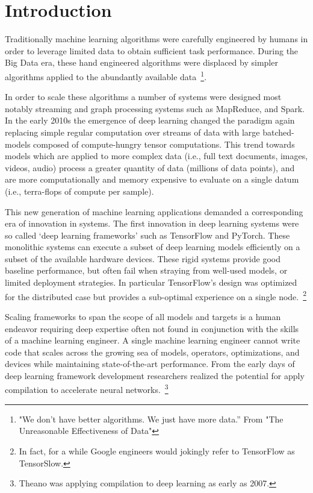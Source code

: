\chapter{Introduction}
\label{ch:intro}

Traditionally machine learning algorithms were carefully engineered by humans
  in order to leverage limited data to obtain sufficient task performance.
During the Big Data era, these hand engineered algorithms were displaced by
  simpler algorithms applied to the abundantly available data~\citep{unreasonable}\footnote{"We don’t have better algorithms. We just have more data.” From "The Unreasonable Effectiveness of Data"}.

In order to scale these algorithms a number of systems were
  designed most notably streaming and graph processing systems such as MapReduce, and Spark.
In the early 2010s the emergence of deep learning changed the paradigm again
  replacing simple regular computation over streams of data with large batched-models
  composed of compute-hungry tensor computations.
This trend towards models which are applied to more complex data (i.e., full text documents, images, videos, audio)
  process a greater quantity of data (millions of data points), and are more computationally and memory expensive
  to evaluate on a single datum (i.e., terra-flops of compute per sample).

This new generation of machine learning applications demanded a corresponding era of
  innovation in systems.
The first innovation in deep learning systems were so called
  ‘deep learning frameworks’ such as TensorFlow and PyTorch.
These monolithic systems can execute a subset of deep learning models
  efficiently on a subset of the available hardware devices.
These rigid systems provide good baseline performance, but often fail
  when straying from well-used models, or limited deployment strategies.
In particular TensorFlow's design was optimized for the distributed case
  but provides a sub-optimal experience on a single node.~\footnote{In fact, for a while Google engineers would jokingly refer to TensorFlow as TensorSlow.}

Scaling frameworks to span the scope of all models and targets is a human endeavor
  requiring deep expertise often not found in conjunction with the skills of a
  machine learning engineer.
A single machine learning engineer cannot write code that scales across the growing
  sea of models, operators, optimizations, and devices while maintaining state-of-the-art
  performance.
From the early days of deep learning framework development researchers realized the
  potential for apply compilation to accelerate neural networks.~\footnote{Theano was applying
  compilation to deep learning as early as 2007.}

